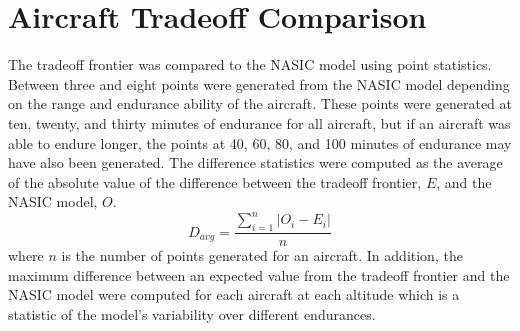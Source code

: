\section{Aircraft Tradeoff Comparison}
The tradeoff frontier was compared to the NASIC model using point statistics. Between three and eight points were generated from the NASIC model depending on the range and endurance ability of the aircraft. These points were generated at ten, twenty, and thirty minutes of endurance for all aircraft, but if an aircraft was able to endure longer, the points at 40, 60, 80, and 100 minutes of endurance may have also been generated. The difference statistics were computed as the average of the absolute value of the difference between the tradeoff frontier, $E$, and the NASIC model, $O$.
\begin{equation}
    D_{avg} = \dfrac{\sum_{i = 1}^n |O_i-E_i|}{n}
\end{equation}
where $n$ is the number of points generated for an aircraft. In addition, the maximum difference between an expected value from the tradeoff frontier and the NASIC model were computed for each aircraft at each altitude which is a statistic of the model's variability over different endurances.
\begin{table}[H]
\caption{Difference Statistics Between NASIC Model and Tradeoff Model}
\label{tab:diffstatistics}
\end{table}

